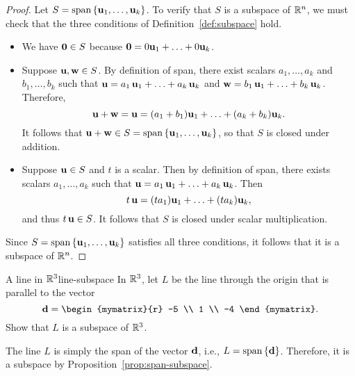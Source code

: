 \begin{proof}
  Let $S=\sspan\set{\vect{u}_1,\ldots,\vect{u}_k}$. To verify that $S$
  is a subspace of\/ $\mathbb{R}^n$, we must check that the three conditions
  of Definition~\ref{def:subspace} hold.
  \begin{itemize}
  \item We have $\vect{0}\in S$ because
    $\vect{0}=0\vect{u}_1+\ldots+0\vect{u}_k$.
  \item Suppose $\vect{u},\vect{w}\in S$.
    By definition of span, there exist scalars $a_1,\ldots,a_k$ and
    $b_1,\ldots,b_k$ such that
    $\vect{u}=a_1\,\vect{u}_1+\ldots+a_k\,\vect{u}_k$ and
    $\vect{w}=b_1\,\vect{u}_1+\ldots+b_k\,\vect{u}_k$.
    Therefore,
    \begin{equation*}
      \vect{u}+\vect{w} = \vect{u}=(a_1+b_1)\vect{u}_1+\ldots+(a_k+b_k)\vect{u}_k.
    \end{equation*}
    It follows that
    $\vect{u}+\vect{w}\in S=\sspan\set{\vect{u}_1,\ldots,\vect{u}_k}$,
    so that $S$ is closed under addition.
  \item Suppose $\vect{u}\in S$ and $t$ is a scalar. Then by
    definition of span, there exists scalars $a_1,\ldots,a_k$ such
    that $\vect{u}=a_1\,\vect{u}_1+\ldots+a_k\,\vect{u}_k$. Then
    \begin{equation*}
      t\,\vect{u}=(ta_1)\vect{u}_1+\ldots+(ta_k)\vect{u}_k,
    \end{equation*}
    and thus $t\,\vect{u}\in S$. It follows that $S$ is closed under
    scalar multiplication.
  \end{itemize}
  Since $S=\sspan\set{\vect{u}_1,\ldots,\vect{u}_k}$ satisfies all
  three conditions, it follows that it is a subspace of\/ $\mathbb{R}^n$.
\end{proof}

\begin{example}{A line in $\mathbb{R}^3$}{line-subspace}
  In $\mathbb{R}^3$, let $L$ be the line through the origin that is
  parallel to the vector
  \begin{equation*}
    {\vect{d}}= \begin{mymatrix}{r} -5 \\ 1 \\ -4 \end{mymatrix}.
  \end{equation*}
  Show that $L$ is a subspace of\/ $\mathbb{R}^3$.
\end{example}

\begin{solution}
  The line $L$ is simply the span of the vector $\vect{d}$, i.e.,
  $L=\sspan\set{\vect{d}}$. Therefore, it is a subspace by
  Proposition~\ref{prop:span-subspace}.
\end{solution}

